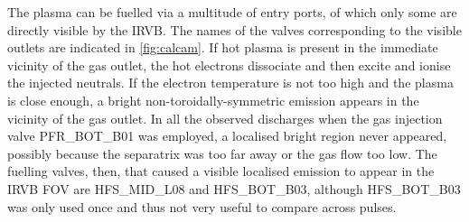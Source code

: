 
The plasma can be fuelled via a multitude of entry ports, of which only some are directly visible by the IRVB. The names of the valves corresponding to the visible outlets are indicated in \autoref{fig:calcam}. %
If hot plasma is present in the immediate vicinity of the gas outlet, the hot electrons dissociate and then excite and ionise the injected neutrals. If the electron temperature is not too high and the plasma is close enough, a bright non-toroidally-symmetric emission appears in the vicinity of the gas outlet. In all the observed discharges when the gas injection valve PFR\_BOT\_B01 was employed, a localised bright region never appeared, possibly because the separatrix was too far away or the gas flow too low. The fuelling valves, then, that caused a visible localised emission to appear in the IRVB FOV are HFS\_MID\_L08 and HFS\_BOT\_B03, although HFS\_BOT\_B03 was only used once and thus not very useful to compare across pulses.



